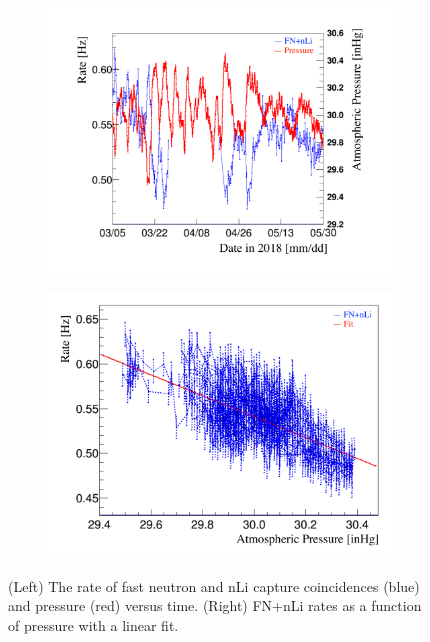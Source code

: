 \begin{figure}[!b]
	\begin{subfigure}{0.5\linewidth}
		\centering
		\includegraphics[width=0.95\linewidth]{tex/7-oscillation-images/FNnLi_Rate}
		\label{fig:fnnlirate}
	\end{subfigure}
	\begin{subfigure}{0.5\linewidth}
		\centering
		\includegraphics[width=0.95\linewidth]{tex/7-oscillation-images/FNnLi_RateVsPressure}
		\label{fig:fnnliratevspressure}
	\end{subfigure}
	\caption[]{(Left) The rate of fast neutron and nLi capture coincidences (blue) and pressure (red) versus time. (Right) FN+nLi rates as a function of pressure with a linear fit. \cite{Kyzylova2370:2018}}
	\label{fig:atm}
\end{figure}

